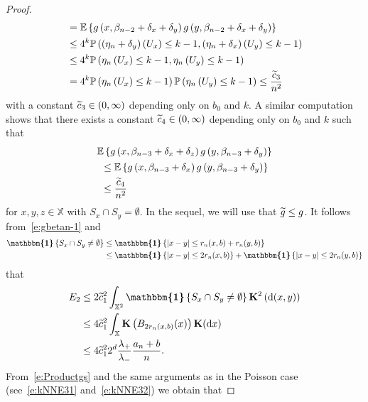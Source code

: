 \documentclass[10pt]{amsart}
\theoremstyle{definition}\newtheorem{defi}[theo]{Definition}\newtheorem{rema}[theo]{Remark}\newtheorem{exam}[theo]{Example}\newtheorem{exem}[theo]{Example}\newtheorem{nota}[theo]{Notation}
\newcommand*\bK{\mathbf{K}}
\renewcommand*\P{\mathbb{P}}
\newcommand*\X{\mathbb{X}}
\newcommand{\E}{\mathbb{E}}
\newcommand*\md{\mathrm{d}}
\newcommand{\mean}[1] {\E\left\{{#1}\right\}}
\newcommand{\ind}{\boldsymbol{\mathbbm{1}}}
\newcommand{\prob}[1]{\P\left(#1\right)}
\let\oldtilde\tilde
\renewcommand*{\tilde}[1]{\mathchoice{\widetilde{#1}}{\widetilde{#1}}{\oldtilde{#1}}{\oldtilde{#1}}}
\begin{document}
\begin{proof}
\begin{multline}
\begin{aligned}
&= \mean{g\left(x,\beta_{n-2}+\delta_x+\delta_y\right) g\left(y,\beta_{n-2}+\delta_x+\delta_y\right)} \\
& \leq 4^k \prob{\left(\eta_{n}+\delta_y\right)\left(U_{x}\right)\leq k-1, \left(\eta_{n}+\delta_x\right)\left(U_{y}\right)\leq k-1}\\
&\leq 4^k \prob{\eta_{n}\left(U_{x}\right)\leq k-1, \eta_{n}\left(U_{y}\right)\leq k-1} \\
& = 4^k \prob{\eta_{n}\left(U_{x}\right)\leq k-1} \prob{\eta_{n}\left(U_{y}\right)\leq k-1} \leq \frac{\tilde{c}_3}{n^2}
\end{aligned}
\end{multline}
with a constant $\tilde{c}_3\in(0,\infty)$ depending only on $b_0$ and $k$. A similar computation shows that there exists a constant $\tilde{c}_4\in(0,\infty)$ depending only on $b_0$ and $k$ such that
\begin{multline}\label{eqn:gSquareDisjointn-3}
\mean{g\left(x,\beta_{n-3}+\delta_x+\delta_z\right) g\left(y,\beta_{n-3}+\delta_y\right)}\\
\begin{aligned}
&\leq \mean{g\left(x,\beta_{n-3}+\delta_x\right) g\left(y,\beta_{n-3}+\delta_y\right)}
\\
&\leq \frac{\tilde{c}_4}{n^2}
\end{aligned}
\end{multline}
for $x,y,z\in \X$ with $S_x\cap S_y = \emptyset$. In the sequel, we will use that $\tilde{g}\leq g$. It follows from~\eqref{e:gbetan-1} and
\begin{align*}
\ind\left\{S_{x}\cap S_{y}\neq \emptyset\right\} & \leq \ind\left\{|x-y|\leq r_n(x,b)+r_n(y,b)\right\} \\
& \leq \ind\left\{|x-y|\leq 2r_n(x,b)\right\} + \ind\left\{|x-y|\leq 2r_n(y,b)\right\}
\end{align*}
that
\begin{equation}\label{e:E2b}
\begin{split}
E_2 & \leq 2 \tilde{c}_1^2 \int_{\X^2} \ind\left\{S_{x}\cap S_{y}\neq \emptyset\right\} \bK^2\left(\md (x,y)\right)\\
&\leq 4 \tilde{c}_1^2 \int_{\X} \bK\left(B_{2r_n(x,b)}(x)\right) \bK(\md x)\\
&\leq 4 \tilde{c}_1^2 2^d \frac{\lambda_+}{\lambda_-} \frac{a_n+b}{n}.
\end{split}
\end{equation}
From~\eqref{e:Productgs} and the same arguments as in the Poisson case (see~\eqref{e:kNNE31} and~\eqref{e:kNNE32}) we obtain that

\end{proof}
\end{document}
